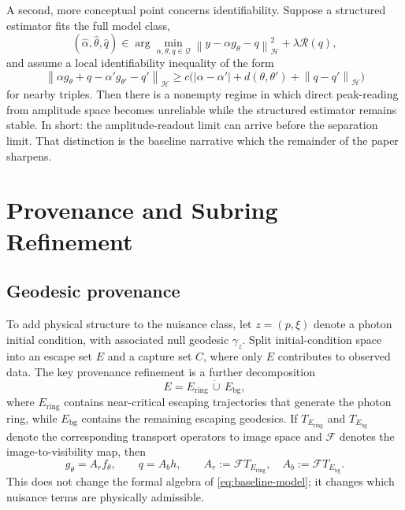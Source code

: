 \documentclass[11pt,a4paper]{article}
\theoremstyle{definition}
\theoremstyle{remark}
\newcommand{\norm}[1]{\left\lVert #1 \right\rVert}
\newcommand{\abs}[1]{\left\lvert #1 \right\rvert}
\begin{document}
A second, more conceptual point concerns identifiability. Suppose a structured estimator fits the full model class,
\begin{equation}
(\hat\alpha,\hat\theta,\hat q)
\in
\arg\min_{\alpha,\theta,q\in\mathcal Q}
\norm{y-\alpha g_\theta-q}_{\mathcal H}^2 + \lambda \mathcal R(q),
\label{eq:structured-fit}
\end{equation}
and assume a local identifiability inequality of the form
\begin{equation}
\norm{\alpha g_\theta + q - \alpha' g_{\theta'} - q'}_{\mathcal H}
\ge
c \bigl(\abs{\alpha-\alpha'} + d(\theta,\theta') + \norm{q-q'}_{\mathcal H}\bigr)
\label{eq:identifiability}
\end{equation}
for nearby triples. Then there is a nonempty regime in which direct peak-reading from amplitude space becomes unreliable while the structured estimator remains stable. In short: the amplitude-readout limit can arrive before the separation limit. That distinction is the baseline narrative which the remainder of the paper sharpens.

\section{Provenance and Subring Refinement}
\label{sec:provenance}

\subsection{Geodesic provenance}

To add physical structure to the nuisance class, let $z=(p,\xi)$ denote a photon initial condition, with associated null geodesic $\gamma_z$. Split initial-condition space into an escape set $E$ and a capture set $C$, where only $E$ contributes to observed data. The key provenance refinement is a further decomposition
\[
E = E_{\mathrm{ring}} \,\dot\cup\, E_{\mathrm{bg}},
\]
where $E_{\mathrm{ring}}$ contains near-critical escaping trajectories that generate the photon ring, while $E_{\mathrm{bg}}$ contains the remaining escaping geodesics. If $T_{E_{\mathrm{ring}}}$ and $T_{E_{\mathrm{bg}}}$ denote the corresponding transport operators to image space and $\mathcal F$ denotes the image-to-visibility map, then
\[
g_\theta = A_r f_\theta,
\qquad
q = A_b h,
\qquad
A_r := \mathcal F T_{E_{\mathrm{ring}}},
\quad
A_b := \mathcal F T_{E_{\mathrm{bg}}}.
\]
This does not change the formal algebra of \eqref{eq:baseline-model}; it changes which nuisance terms are physically admissible.
\end{document}
